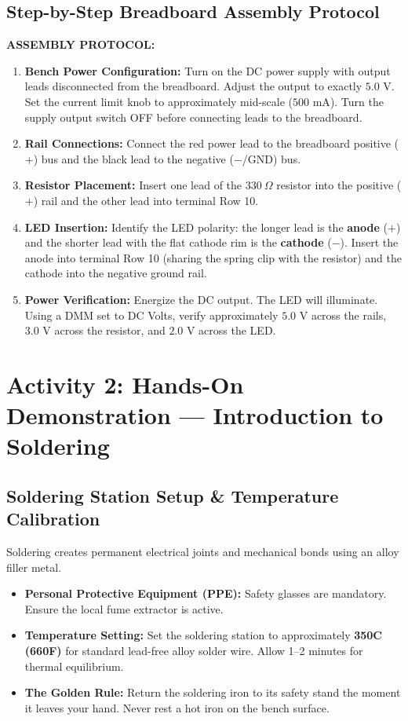 \subsection{Step-by-Step Breadboard Assembly Protocol}
\begin{activitybox}
\textbf{ASSEMBLY PROTOCOL:}
\begin{enumerate}[leftmargin=1.5em]
    \item \textbf{Bench Power Configuration:} Turn on the DC power supply with output leads disconnected from the breadboard. Adjust the output to exactly $5.0\text{ V}$. Set the current limit knob to approximately mid-scale ($500\text{ mA}$). Turn the supply output switch OFF before connecting leads to the breadboard.
    \item \textbf{Rail Connections:} Connect the red power lead to the breadboard positive ($+$) bus and the black lead to the negative ($-$/GND) bus.
    \item \textbf{Resistor Placement:} Insert one lead of the $330\ \Omega$ resistor into the positive ($+$) rail and the other lead into terminal Row 10.
    \item \textbf{LED Insertion:} Identify the LED polarity: the longer lead is the \textbf{anode} ($+$) and the shorter lead with the flat cathode rim is the \textbf{cathode} ($-$). Insert the anode into terminal Row 10 (sharing the spring clip with the resistor) and the cathode into the negative ground rail.
    \item \textbf{Power Verification:} Energize the DC output. The LED will illuminate. Using a DMM set to DC Volts, verify approximately $5.0\text{ V}$ across the rails, $3.0\text{ V}$ across the resistor, and $2.0\text{ V}$ across the LED.
\end{enumerate}
\end{activitybox}

\section{Activity 2: Hands-On Demonstration --- Introduction to Soldering}

\subsection{Soldering Station Setup \& Temperature Calibration}
Soldering creates permanent electrical joints and mechanical bonds using an alloy filler metal.
\begin{itemize}[leftmargin=1.5em]
    \item \textbf{Personal Protective Equipment (PPE):} Safety glasses are mandatory. Ensure the local fume extractor is active.
    \item \textbf{Temperature Setting:} Set the soldering station to approximately \textbf{350\textdegree C (660\textdegree F)} for standard lead-free alloy solder wire. Allow 1--2 minutes for thermal equilibrium.
    \item \textbf{The Golden Rule:} Return the soldering iron to its safety stand the moment it leaves your hand. Never rest a hot iron on the bench surface.
\end{itemize}

